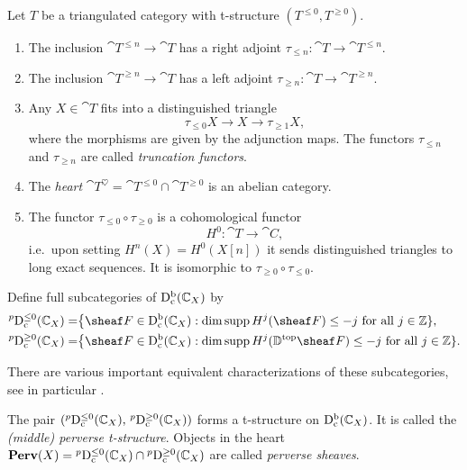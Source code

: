 \documentclass[number-in-sections,a4paper]{notes}
\begin{document}
\begin{Theorem}
    Let $T$ be a triangulated category with t-structure $(T^{\le 0}, T^{\ge 0})$.
    \begin{enumerate}
        \item The inclusion $\cat T^{\le n} \to \cat T$ has a right adjoint $\tau_{\le n}\colon \cat T \to \cat T^{\le n}$.
        \item The inclusion $\cat T^{\ge n} \to \cat T$ has a left adjoint $\tau_{\ge n}\colon \cat T \to \cat T^{\ge n}$.
        \item Any $X \in \cat T$ fits into a distinguished triangle
            \[
                \tau_{\le 0} X \to X \to \tau_{\ge 1} X,
            \]
            where the morphisms are given by the adjunction maps.
            The functors $\tau_{\le n}$ and $\tau_{\ge n}$ are called \emph{truncation functors}.
        \item The \emph{heart} $\cat T^\heartsuit = \cat T^{\le 0} \cap \cat T^{\ge 0}$ is an abelian category.
        \item The functor $\tau_{\le 0} \circ \tau_{\ge 0}$ is a cohomological functor
            \[
                H^0\colon \cat T \to \cat C,
            \]
            i.e.~upon setting $H^n(X) = H^0(X[n])$ it sends distinguished triangles to long exact sequences.
            It is isomorphic to $\tau_{\ge 0} \circ \tau_{\le 0}$.
    \end{enumerate}
\end{Theorem}

\begin{Definition}
    Define full subcategories of $\mathrm{D}^{\mathrm{b}}_{\mathrm{c}}({\mathbb{C}}_{X})$ by
    \begin{align*}
        \catDPerv{\le 0}{X} =& \bigl\{ \sheaf F \in \catDbConstr{X} : \dim \supp H^j(\sheaf F) \le -j \text{ for all } j \in \ZZ\}, \\
        \catDPerv{\ge 0}{X} =& \bigl\{ \sheaf F \in \catDbConstr{X} : \dim \supp H^j(\topDD\sheaf F) \le -j \text{ for all } j \in \ZZ\}.
    \end{align*}
\end{Definition}

\begin{Remark}
    There are various important equivalent characterizations of these subcategories, see in particular \cite[Proposition~8.1.22]{HottaTakeuchiTanisaki:2008:DModulesPerverseSheavesRepresentationTheory}.
\end{Remark}

\begin{Theorem}
    The pair $({}^p\mathrm{D}_{\mathrm{c}}^{\le 0}({\mathbb{C}}_{X}),\, {}^p\mathrm{D}_{\mathrm{c}}^{\ge 0}({\mathbb{C}}_{X}))$ forms a t-structure on $\mathrm{D}^{\mathrm{b}}_{\mathrm{c}}({\mathbb{C}}_{X})$.
    It is called the \emph{(middle) perverse t-structure}.
    Objects in the heart $\mathbf{Perv}(X) = {}^p\mathrm{D}_{\mathrm{c}}^{\le 0}({\mathbb{C}}_{X}) \cap {}^p\mathrm{D}_{\mathrm{c}}^{\ge 0}({\mathbb{C}}_{X})$ are called \emph{perverse sheaves}.
\end{Theorem}
\end{document}
